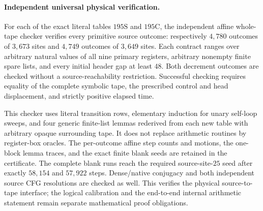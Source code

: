 \paragraph{Independent universal physical verification.}
For each of the exact literal tables $195\mathrm{S}$ and $195\mathrm{C}$,
the independent affine whole-tape checker verifies every primitive source
outcome: respectively $4{,}780$ outcomes of $3{,}673$ sites and $4{,}749$
outcomes of $3{,}649$ sites. Each contract ranges over arbitrary natural
values of all nine primary registers, arbitrary nonempty finite spare
lists, and every initial header gap at least $48$. Both decrement outcomes
are checked without a source-reachability restriction. Successful checking
requires equality of the complete symbolic tape, the prescribed control
and head displacement, and strictly positive elapsed time.

This checker uses literal transition rows, elementary induction for unary
self-loop sweeps, and four generic finite-list lemmas rederived from each
new table with arbitrary opaque surrounding tape. It does not replace
arithmetic routines by register-box oracles. The per-outcome affine step
counts and motions, the one-block lemma traces, and the exact finite blank
seeds are retained in the certificate. The complete blank runs reach the
required source-site-$25$ seed after exactly $58{,}154$ and $57{,}922$
steps. Dense/native conjugacy and both independent source CFG resolutions
are checked as well. This verifies the physical source-to-tape interface;
the logical calibration and the end-to-end internal arithmetic statement
remain separate mathematical proof obligations.
